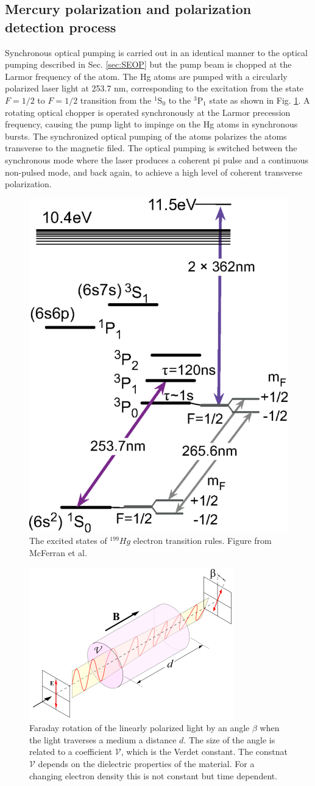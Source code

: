 \subsection{Mercury polarization and polarization detection process}

Synchronous optical pumping is carried out in an identical manner to the optical pumping described in Sec. \ref{sec:SEOP} but the pump beam is chopped at the Larmor frequency of the atom. The Hg atoms are pumped with a circularly polarized laser light at 253.7 nm, corresponding to the excitation from the state $F = 1/2$ to $F = 1/2$ transition from the $^1\textrm{S}_0$ to the $^3\textrm{P}_1$ state as shown in Fig. \ref{fig:HgLevels}. A rotating optical chopper is operated synchronously at the Larmor precession frequency, causing the pump light to impinge on the Hg atoms in synchronous bursts. The synchronized optical pumping of the atoms polarizes the atoms transverse to the magnetic filed. The optical pumping is switched between the synchronous mode where the laser produces a coherent pi pulse and a continuous non-pulsed mode, and back again, to achieve a high level of coherent transverse polarization.

\begin{figure}[htbp]
    \center
    \includegraphics[width=0.3
    \textwidth]{199Hglevels.png}
    \caption{The excited states of $^{199}Hg$ electron transition rules. Figure from McFerran et al. \cite{McFerran2014}}
    \label{fig:HgLevels}
\end{figure}

\begin{figure}[htbp]
    \center
    \includegraphics[width=.4\textwidth]{Faraday.png}
    \caption{Faraday rotation of the linearly polarized light by an angle $\beta$ when the light traverses a medium a distance $d$. The size of the angle is related to a coefficient $\mathcal{V}$, which is the Verdet constant. The constnat $\mathcal{V}$ depends on the dielectric properties of the material. For a changing electron density this is not constant but time dependent. }
    \label{fig:Faraday}
\end{figure}

